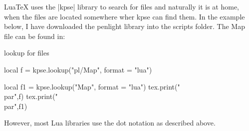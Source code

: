 LuaTeX uses the |kpse| library to search for files and naturally it is at home, when the files are located somewhere wher kpse can find them. In the example below, I have downloaded the penlight library into the scripts folder. The Map file can be found in:

\begin{texexample}{lookup for files}{}
\begin{luacode}
local f = kpse.lookup("pl/Map", {format = "lua"})

local f1 = kpse.lookup("Map", {format = "lua"})
tex.print("\\par",f)
tex.print("\\par",f1)
\end{luacode}
\end{texexample}

However, most Lua libraries use the dot notation as described above.

\endinput

\section{The luatexbase package}

Lua's standard function require() is similar to TEX’s \cmd{} primitive but is somehow more
evolved in that it makes a few checks to avoid loading the same module twice. In the TEX
world, this needs to be taken care of by macro packages; in the LATEX world this is done by
\cmd{\usepackage.}

But \usepackage also takes care of many other things. Most notably, it implements a
complex option system, and does some identification and version checking. The present package
doesn’t try to provide anything for options, but implements a system for identification and
version checking similar to LATEX’s system.

It is important to note that Lua’s function \luacmd{module()} is deprecated in Lua 5.2 and should be
avoided. For examples of good practices for creating modules, see section 1.4. Chapter 15 of
Programming in Lua, 3rd ed. discusses various methods for managing package

The package which was developed by Heiko Oberdiek Élie Roux, Manuel Pégourié-Gonnard, Philipp Gesang∗
provides the function 

|luatexbase.require_module(name [, required date])|

which can be used as a replacement to \luacmd{require()}. The only difference between them being that the luatexbase.require()  will check that the module properly identifies itself.


